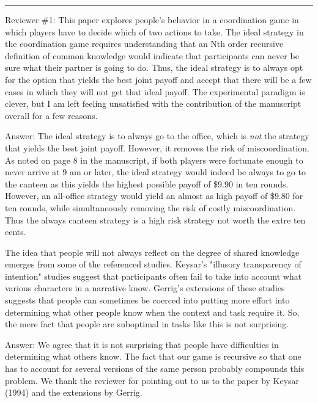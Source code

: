 \documentclass{article}
\newenvironment{robin}{\smallskip \noindent \color{red!10!green!50!blue}}{\color{black}\smallskip}
\begin{document}
\medskip
 \hrule
\medskip

Reviewer \#1: This paper explores people's behavior in a coordination game in which players have to decide which of two actions to take. The ideal strategy in the coordination game requires understanding that an Nth order recursive definition of common knowledge would indicate that participants can never be sure what their partner is going to do. Thus, the ideal strategy is to always opt for the option that yields the best joint payoff and accept that there will be a few cases in which they will not get that ideal payoff. The experimental paradigm is clever, but I am left feeling unsatisfied with the contribution of the manuscript overall for a few reasons.

\begin{robin} Answer: The ideal strategy is to always go to the office, which is \emph{not} the strategy that yields the best joint payoff. However, it removes the risk of miscoordination. As noted on page 8 in the manuscript, if both players were fortunate enough to never arrive at 9 am or later, the ideal strategy would indeed be always to go to the canteen as this yields the highest possible payoff of \$$9.90$ in ten rounds. However, an all-office strategy would yield an almost as high payoff of \$$9.80$ for ten rounds, while simultaneously removing the risk of costly miscoordination. Thus the always canteen strategy is a high risk strategy not worth the extre ten cents.
\end{robin}

The idea that people will not always reflect on the degree of shared knowledge emerges from some of the referenced studies. Keysar's "illusory transparency of intention" studies suggest that participants often fail to take into account what various characters in a narrative know. Gerrig's extensions of these studies suggests that people can sometimes be coerced into putting more effort into determining what other people know when the context and task require it. So, the mere fact that people are suboptimal in tasks like this is not surprising.

\begin{robin} Answer: We agree that it is not surprising that people have difficulties in determining what others know. The fact that our game is recursive so that one has to account for several versions of the same person probably compounds this problem. We thank the reviewer for pointing out to us to the paper by Keysar (1994) and the extensions by Gerrig.
\end{robin}
\end{document}
